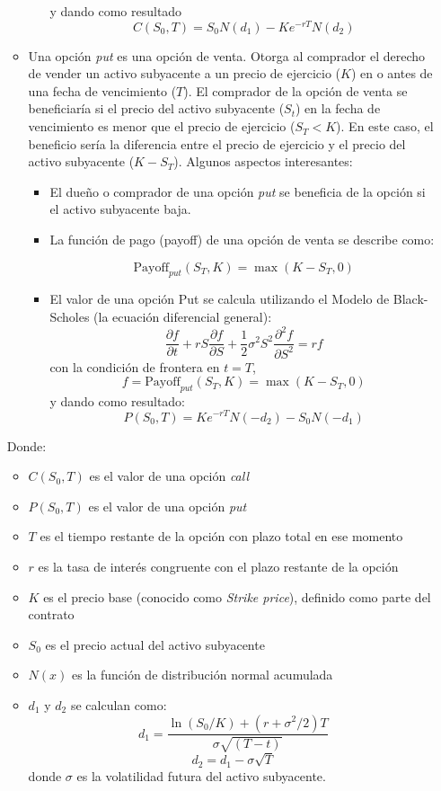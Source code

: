 \begin{problema}[Problema D]
\begin{itemize}
\begin{sol}
\begin{itemize}
\begin{itemize}
                    y dando como resultado
                    $$C(S_0,T) = S_0N(d_1) - Ke^{-rT}N(d_2)$$
                \end{itemize}
                 

                \item Una opción \textit{put} es una opción de venta. Otorga al comprador el derecho de vender un activo subyacente a un precio de ejercicio ($K$) en o antes de una fecha de vencimiento ($T$). El comprador de la opción de venta se beneficiaría si el precio del activo subyacente ($S_t$) en la fecha de vencimiento es menor que el precio de ejercicio ($S_T < K$). En este caso, el beneficio sería la diferencia entre el precio de ejercicio y el precio del activo subyacente ($K - S_T$). Algunos aspectos interesantes: 
                \begin{itemize}
                    \item El dueño o comprador de una opción \textit{put} se beneficia de la opción si el activo subyacente baja.
                    \item La función de pago (payoff) de una opción de venta se describe como:

                    $$\text{Payoff}_{put}(S_T,K)=\max(K-S_T,0)$$
                    \item El valor de una opción Put se calcula utilizando el Modelo de Black-Scholes (la ecuación diferencial general): 
                    $$\frac{\partial f}{\partial t}+rS \frac{\partial f}{\partial S}+\frac{1}{2}\sigma^2 S^2 \frac{\partial ^2 f}{\partial S^2}=rf$$
                    con la condición de frontera en $t=T$, 
                    $$f=\text{Payoff}_{put}(S_T,K)=\max(K-S_T,0)$$
                    y dando como resultado:
                    $$P(S_0,T) = Ke^{-rT}N(-d_2) - S_0N(-d_1)$$
                \end{itemize}
                
            \end{itemize}
    
        
 Donde:
 \begin{itemize}
    \item $C(S_0,T)$ es el valor de una opción \textit{call}
    \item $P(S_0,T)$ es el valor de una opción \textit{put}
    \item $T$ es el tiempo restante de la opción con plazo total en ese momento
    \item $r$ es la tasa de interés congruente con el plazo restante de la opción
    \item $K$ es el precio base (conocido como \textit{Strike price}), definido como parte del contrato
    \item $S_0$ es el precio actual del activo subyacente
    \item $N(x)$ es la función de distribución normal acumulada
    \item $d_1$ y $d_2$ se calculan como: $$d_1 = \frac{\ln(S_0/K) + (r + \sigma^2/2)T}{\sigma \sqrt{(T-t)}}$$
     $$d_2 = d_1 - \sigma \sqrt{T}$$ donde $\sigma$ es la volatilidad futura del activo subyacente.
    

\end{itemize}
\end{sol}
\end{itemize}
\end{problema}
